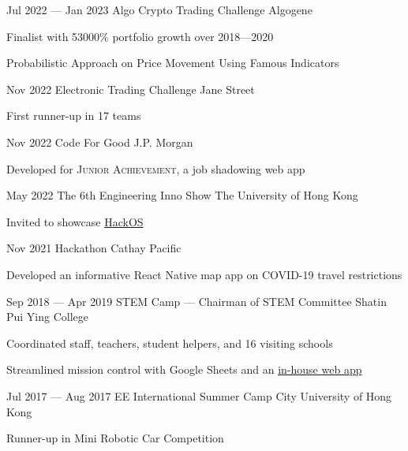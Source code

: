 \activityEntry
{Jul 2022 --- Jan 2023}
{Algo Crypto Trading Challenge}
{Algogene}
{
\begin{descitemize}
    \specialitem Finalist with 53000\% portfolio growth over 2018---2020
    \item Probabilistic Approach on Price Movement Using Famous Indicators
\end{descitemize}
}

\activityEntry
{Nov 2022}
{Electronic Trading Challenge}
{Jane Street}
{
\begin{descitemize}
    \specialitem First runner-up in 17 teams
\end{descitemize}
}

\activityEntry
{Nov 2022}
{Code For Good}
{J.P. Morgan}
{
\begin{descitemize}
    \item Developed for {\scshape Junior Achievement}, a job shadowing web app
\end{descitemize}
}

\activityEntry
{May 2022}
{The 6th Engineering Inno Show}
{The University of Hong Kong}
{
\begin{descitemize}
    \item Invited to showcase \hyperlink{HackOS}{HackOS}
\end{descitemize}
}

\activityEntry
{Nov 2021}
{Hackathon}
{Cathay Pacific}
{
\begin{descitemize}
    \item Developed an informative React Native map app on COVID-19 travel restrictions
\end{descitemize}
}

\activityEntry
{Sep 2018 --- Apr 2019}
{\hypertarget{STEM_Camp_2019}{STEM Camp --- Chairman of STEM Committee}}
{Shatin Pui Ying College}
{
\begin{descitemize}
    \specialitem Coordinated staff, teachers, student helpers, and 16 visiting schools
    \item Streamlined mission control with Google Sheets and an \hyperlink{RTRMS}{in-house web app}
\end{descitemize}
}

\activityEntry
{Jul 2017 --- Aug 2017}
{EE International Summer Camp}
{City University of Hong Kong}
{
\begin{descitemize}
    \specialitem Runner-up in Mini Robotic Car Competition
\end{descitemize}
}
